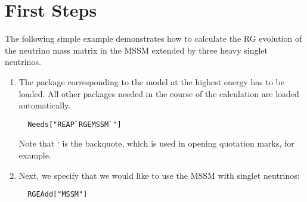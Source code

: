 \section{First Steps\label{sec:FirstSteps}}

The following simple example demonstrates how to calculate the RG
evolution of the neutrino mass matrix in the MSSM extended by three
heavy singlet neutrinos.

\begin{enumerate}

\item The package corresponding to the model at the highest energy has
to be loaded.  All other packages needed in the course of the
calculation are loaded automatically.
\begin{verbatim}
  Needs["REAP`RGEMSSM`"]
\end{verbatim}
Note that ` is the backquote, which is used in opening quotation marks,
for example.

\item Next, we specify that we would like to use the MSSM with singlet
neutrinos:
\begin{verbatim}
  RGEAdd["MSSM"]
\end{verbatim}



\end{enumerate}
